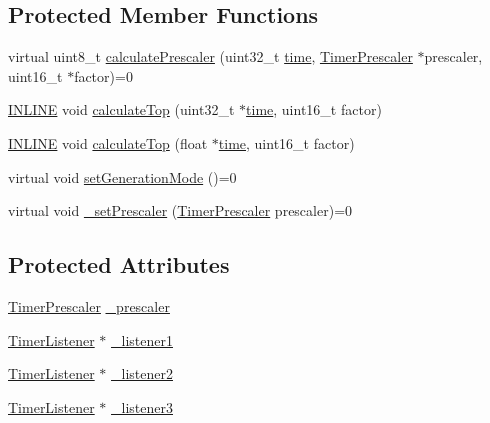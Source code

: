 \subsection*{Protected Member Functions}
\begin{DoxyCompactItemize}
\item 
virtual uint8\-\_\-t \hyperlink{classflame_1_1_timer_a41717d9530f49b0f9ffdc6cd8ed9eb1c}{calculate\-Prescaler} (uint32\-\_\-t \hyperlink{structflame_1_1time}{time}, \hyperlink{namespaceflame_a24dfd057ba5ab5a827abbc4ed902a087}{Timer\-Prescaler} $\ast$prescaler, uint16\-\_\-t $\ast$factor)=0
\item 
\hyperlink{io_8h_a2eb6f9e0395b47b8d5e3eeae4fe0c116}{I\-N\-L\-I\-N\-E} void \hyperlink{classflame_1_1_timer_a1b513a84642ecb450ad53ea28fa93b50}{calculate\-Top} (uint32\-\_\-t $\ast$\hyperlink{structflame_1_1time}{time}, uint16\-\_\-t factor)
\item 
\hyperlink{io_8h_a2eb6f9e0395b47b8d5e3eeae4fe0c116}{I\-N\-L\-I\-N\-E} void \hyperlink{classflame_1_1_timer_aef1b72c7c0de1049587e899c881733fc}{calculate\-Top} (float $\ast$\hyperlink{structflame_1_1time}{time}, uint16\-\_\-t factor)
\item 
virtual void \hyperlink{classflame_1_1_timer_a92a6ed4ed6d6ac6d52ad810d6e9526bd}{set\-Generation\-Mode} ()=0
\item 
virtual void \hyperlink{classflame_1_1_timer_a6e1b57b1ad0d7f4d7cd4f7118ebffb18}{\-\_\-set\-Prescaler} (\hyperlink{namespaceflame_a24dfd057ba5ab5a827abbc4ed902a087}{Timer\-Prescaler} prescaler)=0
\end{DoxyCompactItemize}
\subsection*{Protected Attributes}
\begin{DoxyCompactItemize}
\item 
\hyperlink{namespaceflame_a24dfd057ba5ab5a827abbc4ed902a087}{Timer\-Prescaler} \hyperlink{classflame_1_1_timer_a42ef3eb87072be64291e7eff82c1d0c2}{\-\_\-prescaler}
\item 
\hyperlink{classflame_1_1_timer_listener}{Timer\-Listener} $\ast$ \hyperlink{classflame_1_1_timer_a16d58264dc413116c655a727fa856aaa}{\-\_\-listener1}
\item 
\hyperlink{classflame_1_1_timer_listener}{Timer\-Listener} $\ast$ \hyperlink{classflame_1_1_timer_a3bf0ea6030b447a0a56b3e71809914cc}{\-\_\-listener2}
\item 
\hyperlink{classflame_1_1_timer_listener}{Timer\-Listener} $\ast$ \hyperlink{classflame_1_1_timer_a7bee9ed9b97f3c13037e28e8b87dfa88}{\-\_\-listener3}
\end{DoxyCompactItemize}


